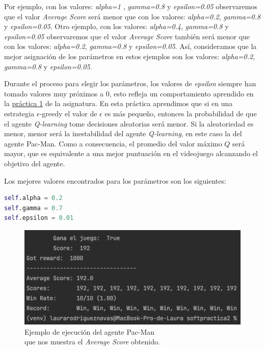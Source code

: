 \documentclass[11pt]{exam}
\begin{document}
Por ejemplo, con los valores: \textit{alpha=1} , \textit{gamma=0.8} y \textit{epsilon=0.05} observaremos que el valor \textit{Average Score} será menor que con los valores: \textit{alpha=0.2}, \textit{gamma=0.8} y \textit{epsilon=0.05}. Otro ejemplo, con los valores: \textit{alpha=0.4}, \textit{gamma=0.8} y \textit{epsilon=0.05} observaremos que el valor \textit{Average Score} también será menor que con los valores: \textit{alpha=0.2}, \textit{gamma=0.8} y \textit{epsilon=0.05}. Así, consideramos que la mejor asignación de los parámetros en estos ejemplos son los valores: \textit{alpha=0.2}, \textit{gamma=0.8} y \textit{epsilon=0.05}.

Durante el proceso para elegir los parámetros, los valores de \textit{epsilon} siempre han tomado valores muy próximos a 0, esto refleja un comportamiento aprendido en la \href{https://poliformat.upv.es/portal/site/ESP_0_2835/tool/c07b745a-0cfd-44f0-a7a2-9bb22f80c3f7?panel=Main}{práctica 1} de la asignatura. En esta práctica aprendimos que si en una estrategia $\epsilon$-greedy el valor de $\epsilon$ es más pequeño, entonces la probabilidad de que el agente \textit{Q-learning} tome decisiones aleatorias será menor. Si la aleatoriedad es menor, menor será la inestabilidad del agente \textit{Q-learning}, en este caso la del agente Pac-Man. Como a consecuencia, el promedio del valor máximo $Q$ será mayor, que es equivalente a una mejor puntuación en el videojuego alcanzando el objetivo del agente.
\vspace*{3mm}

Los mejores valores encontrados para los parámetros son los siguientes:
\vspace*{3mm}

\begin{lstlisting}[language=python, basicstyle=\footnotesize]
self.alpha = 0.2
self.gamma = 0.7
self.epsilon = 0.01
\end{lstlisting}

\begin{figure}[H]
	\centering
	\includegraphics[scale=0.6]{average_score}
	\caption{Ejemplo de ejecución del agente Pac-Man \\ que nos muestra el \textit{Average Score} obtenido.}
	\label{average_score}
\end{figure}
\end{document}
